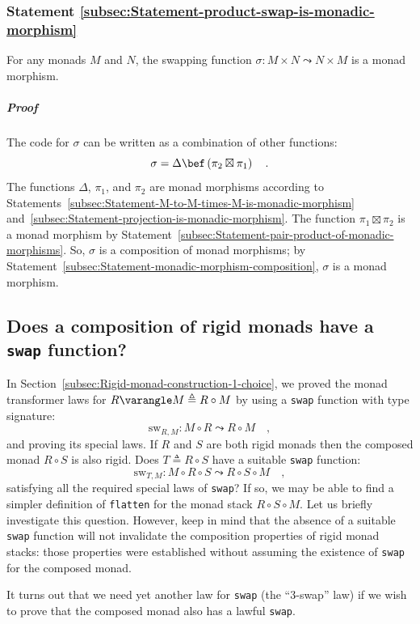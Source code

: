 \subsubsection{Statement \label{subsec:Statement-product-swap-is-monadic-morphism}\ref{subsec:Statement-product-swap-is-monadic-morphism}}

For any monads $M$ and $N$, the swapping function $\sigma:M\times N\leadsto N\times M$
is a monad morphism.

\subparagraph{Proof}

The code for $\sigma$ can be written as a combination of other functions:
\[
\sigma=\Delta\bef\left(\pi_{2}\boxtimes\pi_{1}\right)\quad.
\]
The functions $\Delta$, $\pi_{1}$, and $\pi_{2}$ are monad morphisms
according to Statements~\ref{subsec:Statement-M-to-M-times-M-is-monadic-morphism}
and~\ref{subsec:Statement-projection-is-monadic-morphism}. The function
$\pi_{1}\boxtimes\pi_{2}$ is a monad morphism by Statement~\ref{subsec:Statement-pair-product-of-monadic-morphisms}.
So, $\sigma$ is a composition of monad morphisms; by Statement~\ref{subsec:Statement-monadic-morphism-composition},
$\sigma$ is a monad morphism.

\subsection{Does a composition of rigid monads have a \texttt{swap} function?\label{subsec:Does-a-composition-have-swap}}

In Section~\ref{subsec:Rigid-monad-construction-1-choice}, we proved
the monad transformer laws for $R\varangle M\triangleq R\circ M$
by using a \lstinline!swap! function with type signature:
\[
\text{sw}_{R,M}:M\circ R\leadsto R\circ M\quad,
\]
and proving its special laws. If $R$ and $S$ are both rigid monads
then the composed monad $R\circ S$ is also rigid. Does $T\triangleq R\circ S$
have a suitable \lstinline!swap! function:
\[
\text{sw}_{T,M}:M\circ R\circ S\leadsto R\circ S\circ M\quad,
\]
satisfying all the required special laws of \lstinline!swap!? If
so, we may be able to find a simpler definition of \lstinline!flatten!
for the monad stack $R\circ S\circ M$. Let us briefly investigate
this question. However, keep in mind that the absence of a suitable
\lstinline!swap! function will not invalidate the composition properties
of rigid monad stacks: those properties were established without assuming
the existence of \lstinline!swap! for the composed monad.

It turns out that we need yet another law for \lstinline!swap! (the
\textsf{``}3-swap\textsf{''} law) if we wish to prove that the composed monad also
has a lawful \lstinline!swap!. 

